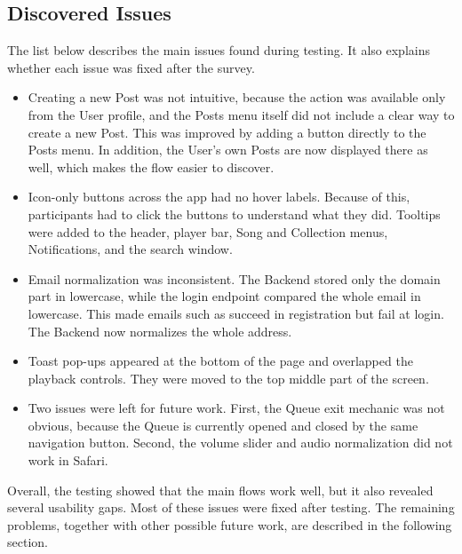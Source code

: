 \subsection{Discovered Issues}
The list below describes the main issues found during testing. It also
explains whether each issue was fixed after the survey.

\begin{itemize}
    \item Creating a new Post was not intuitive, because the action was
    available only from the User profile, and the Posts menu itself did not
    include a clear way to create a new Post. This was improved by
    adding a button directly to the Posts menu. In addition, the User's
    own Posts are now displayed there as well, which makes the flow
    easier to discover.

    \item Icon-only buttons across the app had no hover labels. Because
    of this, participants had to click the buttons to understand what
    they did. Tooltips were added to the header, player bar, Song and
    Collection menus, Notifications, and the search window.

    \item Email normalization was inconsistent. The Backend stored only the
    domain part in lowercase, while the login endpoint compared the whole email in
    lowercase. This made emails such as 
    succeed in registration but fail at login. The
    Backend now normalizes the whole address.

    \item Toast pop-ups appeared at the bottom of the page and overlapped
    the playback controls. They were moved to the top middle part of the
    screen.

    \item Two issues were left for future work. First, the Queue exit
    mechanic was not obvious, because the Queue is currently opened and
    closed by the same navigation button. Second, the volume slider and
    audio normalization did not work in Safari.

\end{itemize}

Overall, the testing showed that the main flows work well, but it also
revealed several usability gaps. Most of these issues were fixed after
testing. The remaining problems, together with other possible future
work, are described in the following section.


